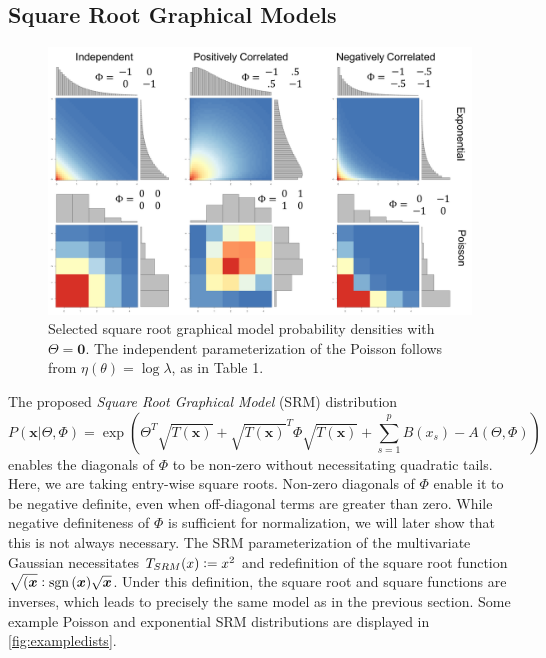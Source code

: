 \documentclass{samkoelleprelimworking}
\DeclareMathOperator{\sgn}{sgn}
\begin{document}
\subsection{Square Root Graphical Models}
\begin{figure}\label{fig:expdists}
\includegraphics[width=1\textwidth]{exampledists}
\caption{Selected square root graphical model probability densities with $\Theta = \bm{0}$.  The independent parameterization of the Poisson follows from $\eta(\theta) = \log \lambda$, as in Table 1.}
\end{figure}

The proposed \textit{Square Root Graphical Model} (SRM) distribution
\[P(\bm{x} \vert \Theta, \Phi) =  \exp(\Theta^T \sqrt{T(\bm{x})} + \sqrt{T(\bm{x})}^T\Phi \sqrt{T(\bm{x})} + \sum_{s=1}^p B(x_s) - A(\Theta,\Phi))\]
enables the diagonals of $\Phi$ to be non-zero without necessitating quadratic tails.  Here, we are taking entry-wise square roots.  Non-zero diagonals of $\Phi$ enable it to be negative definite, even when off-diagonal terms are greater than zero.  While negative definiteness of $\Phi$ is sufficient for normalization, we will later show that this is not always necessary.   The SRM parameterization of the multivariate Gaussian necessitates $T_{SRM}(x) \vcentcolon = x^2$ and redefinition of the square root function $\sqrt{(\bm{x}} \vcentcolon \sgn{(\bm{x})}\sqrt{\bm{x}}$.  Under this definition, the square root and square functions are inverses, which leads to precisely the same model as in the previous section.  Some example Poisson and exponential SRM distributions are displayed in \ref{fig:exampledists}.
\end{document}
